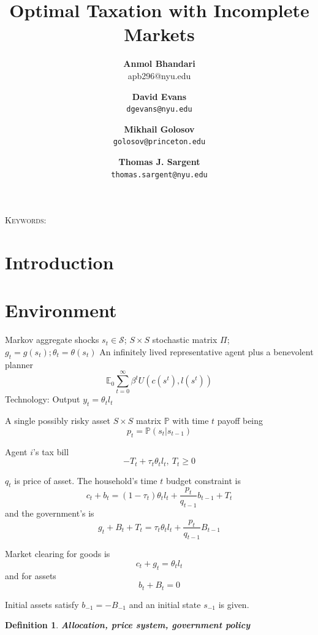 \documentclass[12pt]{article}
\title {Optimal Taxation with Incomplete Markets}
\author{\textbf{Anmol Bhandari}\\apb296@nyu.edu \and \textbf{David Evans} \\ \texttt{dgevans@nyu.edu} \and \textbf{Mikhail Golosov}\\\texttt{golosov@princeton.edu} \and \textbf{Thomas J. Sargent} \\ \texttt{thomas.sargent@nyu.edu}
}
\newtheorem{definition}[theorem]{Definition}
\begin{document}
\maketitle



\begin{abstract}

\end{abstract}


\noindent\textsc{Keywords:}
\section{Introduction}


\section{Environment}




 Markov aggregate shocks $s_t\in \mathcal{S}$; $S \times S$ stochastic matrix $\Pi$; $g_t=g(s_t);\theta_t=\theta(s_t)$
An infinitely lived representative agent plus a benevolent planner
   \begin{equation*}
\mathbb{E}_{0}\sum_{t=0}^{\infty } \beta^t  U\left(
c(s^t),l(s^t)\right)  \label{utility lifetime}
\end{equation*}%
  Technology: Output  $y_t=\theta_{t} l_{t}$

A single possibly risky  asset $S \times S$ matrix $\mathbb{P}$ with time $t$ payoff being
\[p_t=\mathbb{P}(s_{t}|s_{t-1})\]




Agent $i$'s tax bill
\[- T_t + \tau_t \theta_{t}l_{t},  \ T_t \geq 0 \]

 $q_t$ is price of  asset.
 The household's time $t$ budget constraint is
\[ c_{t}+b_{t}=\left( 1-\tau _{t}\right) \theta _{t}l_{t}+\frac{p_{t}}{q_{t-1}}b_{t-1}+T_{t}\] %
 and the government's is
\[g_{t}+B_{t}+T_t=\tau _{t}\theta_{t}l_{t}+\frac{p_{t}}{q_{t-1}}B_{t-1} \]


Market clearing for goods
is \[c_{t}+g_t = \theta _{t} l_{t} \]
and
for assets
\[b_{t}+B_{t}=0\]

Initial assets satisfy $b_{-1}=-B_{-1}$ and an initial state  $s_{-1}$ is given.


\begin{definition}
\textbf{Allocation, price system, government policy}

\end{definition}
\end{document}
